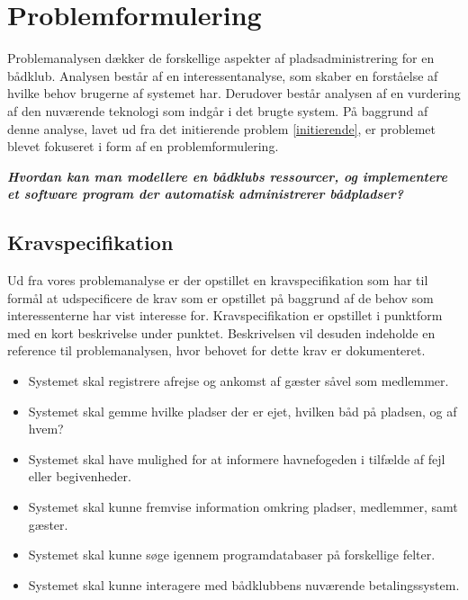 \chapter{Problemformulering}
\label{cha:problemformulering}


Problemanalysen dækker de forskellige aspekter af pladsadministrering for en bådklub. Analysen består af en interessentanalyse, som skaber en forståelse af hvilke behov brugerne af systemet har. Derudover består analysen af en vurdering af den nuværende teknologi som indgår i det brugte system. På baggrund af denne analyse, lavet ud fra det initierende problem \ref{initierende}, er problemet blevet fokuseret i form af en problemformulering.


\begin{displayquote}
	\textbf{\textit{Hvordan kan man modellere en bådklubs ressourcer, og implementere et software program der automatisk administrerer bådpladser?}}
\end{displayquote}

\section{Kravspecifikation} %
\label{sec:Kravspecifikation}

Ud fra vores problemanalyse er der opstillet en kravspecifikation som har til
formål at udspecificere de krav som er opstillet på baggrund af de behov som interessenterne har vist interesse for. 
Kravspecifikation er opstillet i punktform med en kort beskrivelse 
under punktet. Beskrivelsen vil desuden indeholde en reference til problemanalysen, hvor 
behovet for dette krav er dokumenteret.
 

\begin{itemize}
  \item Systemet skal registrere afrejse og ankomst af gæster såvel som medlemmer.
  \item Systemet skal gemme hvilke pladser der er ejet, hvilken båd på pladsen, og af hvem?
  \item Systemet skal have mulighed for at informere havnefogeden i tilfælde af fejl eller begivenheder.
  \item Systemet skal kunne fremvise information omkring pladser, medlemmer, samt gæster.
  \item Systemet skal kunne søge igennem programdatabaser på forskellige felter.	
  \item Systemet skal kunne interagere med bådklubbens nuværende betalingssystem.
\end{itemize}


